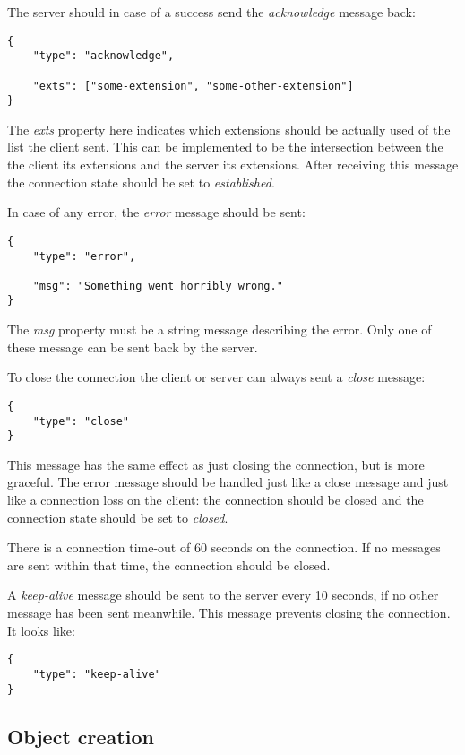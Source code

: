 \documentclass[11pt]{article}
\begin{document}
The server should in case of a success send the \textit{acknowledge} message back:

\begin{verbatim}
{
    "type": "acknowledge",

    "exts": ["some-extension", "some-other-extension"]
}
\end{verbatim}

The \textit{exts} property here indicates which extensions should be actually used of the list the client sent.
This can be implemented to be the intersection between the the client its extensions and the server its extensions.
After receiving this message the connection state should be set to \textit{established}.

In case of any error, the \textit{error} message should be sent:

\begin{verbatim}
{
    "type": "error",

    "msg": "Something went horribly wrong."
}
\end{verbatim}

The \textit{msg} property must be a string message describing the error.
Only one of these message can be sent back by the server.

To close the connection the client or server can always sent a \textit{close} message:

\begin{verbatim}
{
    "type": "close"
}
\end{verbatim}

This message has the same effect as just closing the connection, but is more graceful.
The error message should be handled just like a close message and just like a connection loss on the client: the connection should be closed and the connection state should be set to \textit{closed}.

There is a connection time-out of 60 seconds on the connection.
If no messages are sent within that time, the connection should be closed.

A \textit{keep-alive} message should be sent to the server every 10 seconds, if no other message has been sent meanwhile.
This message prevents closing the connection. It looks like:

\begin{verbatim}
{
    "type": "keep-alive"
}
\end{verbatim}

\subsection{Object creation}
\end{document}
